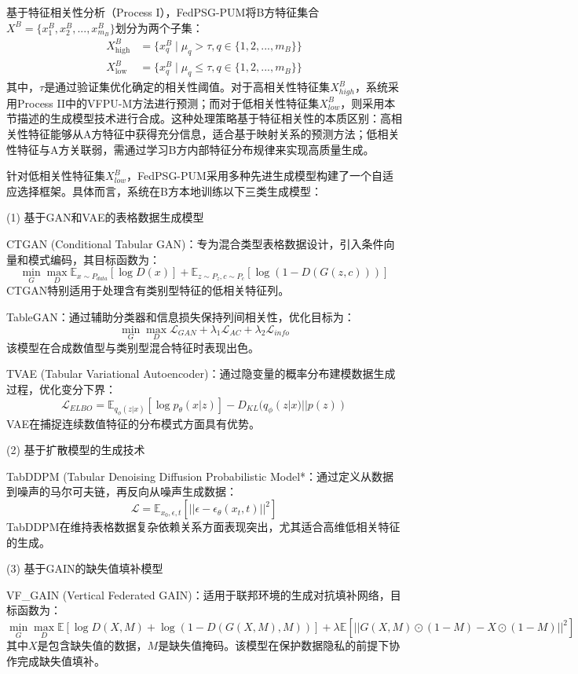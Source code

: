 基于特征相关性分析（Process I），FedPSG-PUM将B方特征集合$X^B = \{x^B_1, x^B_2, ..., x^B_{m_B}\}$划分为两个子集：
\begin{equation}
	\begin{split}
		X^B_{\text{high}} &= \{x^B_q \mid \mu_q > \tau, q \in \{1,2,...,m_B\}\} \\
		X^B_{\text{low}} &= \{x^B_q \mid \mu_q \leq \tau, q \in \{1,2,...,m_B\}\}
	\end{split}
\end{equation}
其中，$\tau$是通过验证集优化确定的相关性阈值。对于高相关性特征集$X^B_{high}$，系统采用Process II中的VFPU-M方法进行预测；而对于低相关性特征集$X^B_{low}$，则采用本节描述的生成模型技术进行合成。这种处理策略基于特征相关性的本质区别：高相关性特征能够从A方特征中获得充分信息，适合基于映射关系的预测方法；低相关性特征与A方关联弱，需通过学习B方内部特征分布规律来实现高质量生成。

针对低相关性特征集$X^B_{low}$，FedPSG-PUM采用多种先进生成模型构建了一个自适应选择框架。具体而言，系统在B方本地训练以下三类生成模型：

(1) 基于GAN和VAE的表格数据生成模型

CTGAN (Conditional Tabular GAN)：专为混合类型表格数据设计，引入条件向量和模式编码，其目标函数为：
$$\min_G \max_D \mathbb{E}_{x \sim P_{data}}[\log D(x)] + \mathbb{E}_{z \sim P_z, c \sim P_c}[\log(1 - D(G(z, c)))]$$
CTGAN特别适用于处理含有类别型特征的低相关特征列。

TableGAN：通过辅助分类器和信息损失保持列间相关性，优化目标为：
$$\min_G \max_D \mathcal{L}_{GAN} + \lambda_1 \mathcal{L}_{AC} + \lambda_2 \mathcal{L}_{info}$$
该模型在合成数值型与类别型混合特征时表现出色。

TVAE (Tabular Variational Autoencoder)：通过隐变量的概率分布建模数据生成过程，优化变分下界：
$$\mathcal{L}_{ELBO} = \mathbb{E}_{q_\phi(z|x)}[\log p_\theta(x|z)] - D_{KL}(q_\phi(z|x) || p(z))$$
VAE在捕捉连续数值特征的分布模式方面具有优势。

(2) 基于扩散模型的生成技术

TabDDPM (Tabular Denoising Diffusion Probabilistic Model*：通过定义从数据到噪声的马尔可夫链，再反向从噪声生成数据：
$$\mathcal{L} = \mathbb{E}_{x_0, \epsilon, t}[||\epsilon - \epsilon_\theta(x_t, t)||^2]$$
TabDDPM在维持表格数据复杂依赖关系方面表现突出，尤其适合高维低相关特征的生成。

(3) 基于GAIN的缺失值填补模型

VF\_GAIN (Vertical Federated GAIN)：适用于联邦环境的生成对抗填补网络，目标函数为：
$$\min_G \max_D \mathbb{E}[\log D(X, M) + \log(1 - D(G(X, M), M))] + \lambda \mathbb{E}[||G(X, M) \odot (1-M) - X \odot (1-M)||^2]$$
其中$X$是包含缺失值的数据，$M$是缺失值掩码。该模型在保护数据隐私的前提下协作完成缺失值填补。

